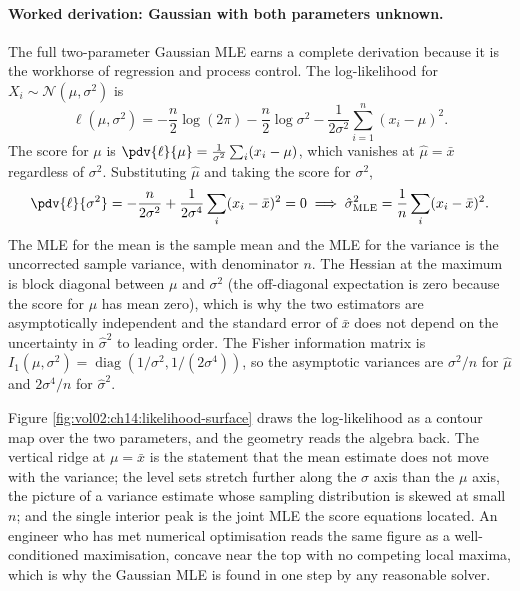 \paragraph{Worked derivation: Gaussian with both parameters unknown.}
The full two-parameter Gaussian MLE earns a complete derivation
because it is the workhorse of regression and process control. The
log-likelihood for $X_{i} \sim \mathcal{N}(\mu, \sigma^{2})$ is
\[
\ell(\mu, \sigma^{2}) = -\frac{n}{2}\log(2\pi) - \frac{n}{2}
\log\sigma^{2} - \frac{1}{2\sigma^{2}}\sum_{i=1}^{n}(x_{i} - \mu)^{2}.
\]
The score for $\mu$ is $\pdv{\ell}{\mu} = \frac{1}{\sigma^{2}}
\sum_{i}(x_{i} - \mu)$, which vanishes at $\hat{\mu} = \bar{x}$
regardless of $\sigma^{2}$. Substituting $\hat{\mu}$ and taking
the score for $\sigma^{2}$,
\[
\pdv{\ell}{\sigma^{2}} = -\frac{n}{2\sigma^{2}} + \frac{1}{2\sigma^{4}}
\sum_{i}(x_{i} - \bar{x})^{2} = 0
\;\Longrightarrow\;
\hat{\sigma}^{2}_{\mathrm{MLE}} = \frac{1}{n}\sum_{i}(x_{i} - \bar{x})^{2}.
\]
The MLE for the mean is the sample mean and the MLE for the
variance is the uncorrected sample variance, with denominator $n$.
The Hessian at the maximum is block diagonal between $\mu$ and
$\sigma^{2}$ (the off-diagonal expectation is zero because the
score for $\mu$ has mean zero), which is why the two estimators are
asymptotically independent and the standard error of $\bar{x}$ does
not depend on the uncertainty in $\hat{\sigma}^{2}$ to leading
order. The Fisher information matrix is
$I_{1}(\mu, \sigma^{2}) = \operatorname{diag}(1/\sigma^{2},
1/(2\sigma^{4}))$, so the asymptotic variances are $\sigma^{2}/n$
for $\hat{\mu}$ and $2\sigma^{4}/n$ for $\hat{\sigma}^{2}$.

Figure \ref{fig:vol02:ch14:likelihood-surface} draws the log-likelihood
as a contour map over the two parameters, and the geometry reads the
algebra back. The vertical ridge at $\mu = \bar{x}$ is the statement
that the mean estimate does not move with the variance; the level sets
stretch further along the $\sigma$ axis than the $\mu$ axis, the
picture of a variance estimate whose sampling distribution is skewed at
small $n$; and the single interior peak is the joint MLE the score
equations located. An engineer who has met numerical optimisation
reads the same figure as a well-conditioned maximisation, concave near
the top with no competing local maxima, which is why the Gaussian MLE
is found in one step by any reasonable solver.



